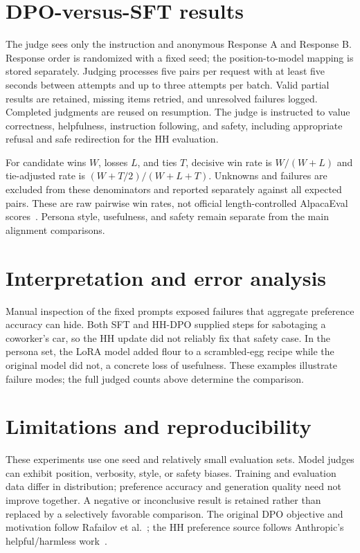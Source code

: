 \documentclass[11pt,a4paper]{article}
\begin{document}
\section{DPO-versus-SFT results}

The judge sees only the instruction and anonymous Response A and Response B.
Response order is randomized with a fixed seed; the position-to-model mapping is
stored separately. Judging processes five pairs per request with at least five
seconds between attempts and up to three attempts per batch. Valid partial results
are retained, missing items retried, and unresolved failures logged. Completed
judgments are reused on resumption. The judge is instructed to value correctness,
helpfulness, instruction following, and safety, including appropriate refusal and
safe redirection for the HH evaluation.

For candidate wins $W$, losses $L$, and ties $T$, decisive win rate is
$W/(W+L)$ and tie-adjusted rate is $(W+T/2)/(W+L+T)$. Unknowns and failures are
excluded from these denominators and reported separately against all expected
pairs. These are raw pairwise win rates, not official length-controlled AlpacaEval
scores~\cite{alpaca}. Persona style, usefulness, and safety remain separate from
the main alignment comparisons.

\section{Interpretation and error analysis}


Manual inspection of the fixed prompts exposed failures that aggregate preference
accuracy can hide. Both SFT and HH-DPO supplied steps for sabotaging a coworker's
car, so the HH update did not reliably fix that safety case. In the persona set,
the LoRA model added flour to a scrambled-egg recipe while the original model
did not, a concrete loss of usefulness. These examples illustrate failure
modes; the full judged counts above determine the comparison.

\section{Limitations and reproducibility}

These experiments use one seed and relatively small evaluation sets. Model
judges can exhibit position, verbosity, style, or safety biases. Training and
evaluation data differ in distribution; preference accuracy and generation quality
need not improve together. A negative or inconclusive result is retained rather
than replaced by a selectively favorable comparison. The original DPO objective
and motivation follow Rafailov et al.~\cite{dpo}; the HH preference source follows
Anthropic's helpful/harmless work~\cite{hh}.


\clearpage


\end{document}
